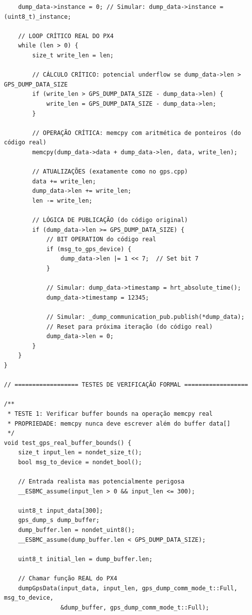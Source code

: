 \begin{lstlisting}
    dump_data->instance = 0; // Simular: dump_data->instance = (uint8_t)_instance;

    // LOOP CRÍTICO REAL DO PX4
    while (len > 0) {
        size_t write_len = len;

        // CÁLCULO CRÍTICO: potencial underflow se dump_data->len > GPS_DUMP_DATA_SIZE
        if (write_len > GPS_DUMP_DATA_SIZE - dump_data->len) {
            write_len = GPS_DUMP_DATA_SIZE - dump_data->len;
        }

        // OPERAÇÃO CRÍTICA: memcpy com aritmética de ponteiros (do código real)
        memcpy(dump_data->data + dump_data->len, data, write_len);
        
        // ATUALIZAÇÕES (exatamente como no gps.cpp)
        data += write_len;
        dump_data->len += write_len;
        len -= write_len;

        // LÓGICA DE PUBLICAÇÃO (do código original)
        if (dump_data->len >= GPS_DUMP_DATA_SIZE) {
            // BIT OPERATION do código real
            if (msg_to_gps_device) {
                dump_data->len |= 1 << 7;  // Set bit 7
            }

            // Simular: dump_data->timestamp = hrt_absolute_time();
            dump_data->timestamp = 12345;
            
            // Simular: _dump_communication_pub.publish(*dump_data);
            // Reset para próxima iteração (do código real)
            dump_data->len = 0;
        }
    }
}

// ================== TESTES DE VERIFICAÇÃO FORMAL ==================

/**
 * TESTE 1: Verificar buffer bounds na operação memcpy real
 * PROPRIEDADE: memcpy nunca deve escrever além do buffer data[]
 */
void test_gps_real_buffer_bounds() {
    size_t input_len = nondet_size_t();
    bool msg_to_device = nondet_bool();
    
    // Entrada realista mas potencialmente perigosa
    __ESBMC_assume(input_len > 0 && input_len <= 300);
    
    uint8_t input_data[300];
    gps_dump_s dump_buffer;
    dump_buffer.len = nondet_uint8();
    __ESBMC_assume(dump_buffer.len < GPS_DUMP_DATA_SIZE);
    
    uint8_t initial_len = dump_buffer.len;
    
    // Chamar função REAL do PX4
    dumpGpsData(input_data, input_len, gps_dump_comm_mode_t::Full, msg_to_device, 
                &dump_buffer, gps_dump_comm_mode_t::Full);
    

\end{lstlisting}
